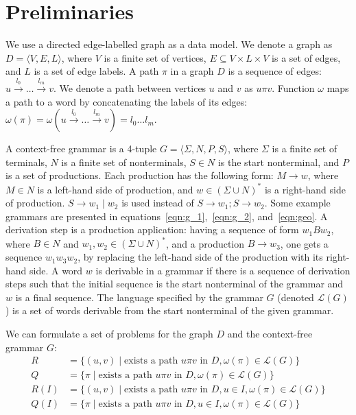 \section{Preliminaries}


We use a directed edge-labelled graph as a data model. We denote a graph as $D=\langle V,E,L \rangle$, where $V$ is a finite set of vertices, $E \subseteq V \times L \times V$ is a set of edges, and $L$ is a set of edge labels. A path $\pi$ in a graph $D$ is a sequence of edges: $u \xrightarrow{l_0} \ldots \xrightarrow{l_m} v$. We denote a path between vertices $u$ and $v$ as $u\pi v$. Function $\omega$ maps a path to a word by concatenating the labels of its edges: $\omega(\pi) = \omega(u \xrightarrow{l_0} \ldots \xrightarrow{l_m} v) = l_0\ldots l_m .$

A context-free grammar is a 4-tuple $G=\langle \Sigma, N, P, S\rangle$, where $\Sigma$ is a finite set of terminals, $N$ is a finite set of nonterminals, $S \in N$ is the start nonterminal, and $P$ is a set of productions. Each production has the following form: $M \to w$, where $M \in N$ is a left-hand side of production, and $w \in (\Sigma \cup N )^*$ is a right-hand side of production. $S \to w_1 \mid w_2$ is used instead of $S \to w_1; S \to w_2$. Some example grammars are presented in equations~\ref{eqn:g_1},~\ref{eqn:g_2}, and~\ref{eqn:geo}. A derivation step is a production application: having a sequence of form $w_1Bw_2$, where $B \in N$ and $w_1, w_2 \in (\Sigma \cup N)^*$, and a production $B \to w_3$, one gets a sequence $w_1w_3w_2$, by replacing the left-hand side of the production with its right-hand side. A word $w$ is derivable in a grammar if there is a sequence of derivation steps such that the initial sequence is the start nonterminal of the grammar and $w$ is a final sequence. The language specified by the grammar $G$ (denoted $\mathcal{L}(G)$) is a set of words derivable from the start nonterminal of the given grammar.

We can formulate a set of problems for the graph $D$ and the context-free grammar $G$: 
\begin{align}
R &= \{(u,v) \mid \text{exists a path } u\pi v \text{ in } D, \omega(\pi) \in \mathcal{L}(G)  \} \label{eqn:all_pairs_reachability}
\\
Q &= \{\pi \mid \text{exists a path } u\pi v \text{ in } D, \omega(\pi) \in \mathcal{L}(G)  \} \label{eqn:all_pairs_all_paths}
\\
R(I) &= \{(u,v) \mid \text{exists a path } u\pi v \text{ in } D, u \in I, \omega(\pi) \in \mathcal{L}(G)  \} \label{eqn:multiple_source_reachability}
\\
Q(I) &= \{\pi \mid \text{exists a path } u\pi v \text{ in } D, u \in I, \omega(\pi) \in \mathcal{L}(G)  \} \label{eqn:multiple_source_all_paths}
\end{align}

